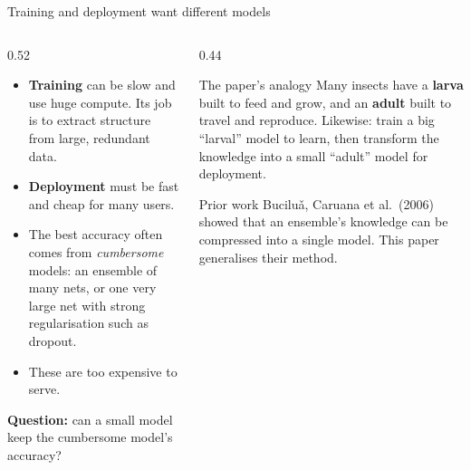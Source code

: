 \documentclass[aspectratio=169,11pt]{beamer}
\begin{document}
\begin{frame}{Training and deployment want different models}
  \begin{columns}[T]
    \begin{column}{0.52\textwidth}
      \small
      \begin{itemize}
        \item \textbf{Training} can be slow and use huge compute. Its job is to extract structure from large, redundant data.
        \item \textbf{Deployment} must be fast and cheap for many users.
        \item The best accuracy often comes from \emph{cumbersome} models: an ensemble of many nets, or one very large net with strong regularisation such as dropout.
        \item These are too expensive to serve.
      \end{itemize}
      \vspace{1mm}
      \textbf{Question:} can a small model keep the cumbersome model's accuracy?
    \end{column}
    \begin{column}{0.44\textwidth}
      \begin{exampleblock}{The paper's analogy}
        \small
        Many insects have a \textbf{larva} built to feed and grow, and an \textbf{adult} built to travel and reproduce.
        Likewise: train a big ``larval'' model to learn, then transform the knowledge into a small ``adult'' model for deployment.
      \end{exampleblock}
      \begin{block}{Prior work}
        \small
        Bucilu\v{a}, Caruana et al.\ (2006) showed that an ensemble's knowledge can be compressed into a single model. This paper generalises their method.
      \end{block}
    \end{column}
  \end{columns}
\end{frame}
\end{document}
